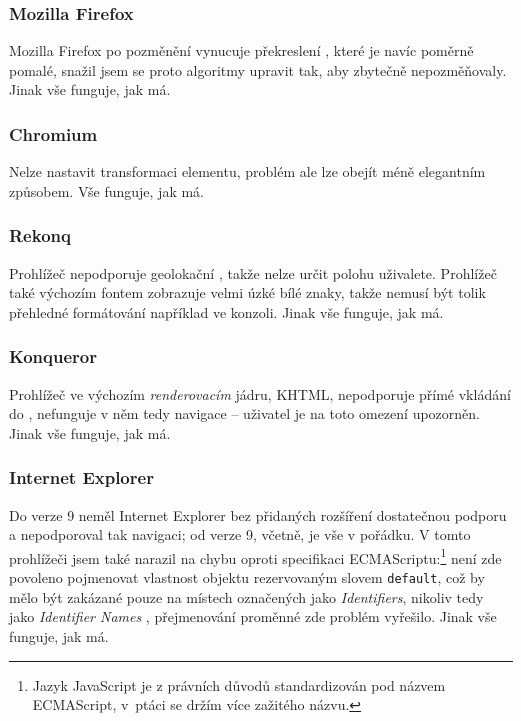 \subsubsection*{Mozilla Firefox}
Mozilla Firefox po pozměnění vynucuje překreslení , které je navíc poměrně pomalé, snažil jsem se proto algoritmy upravit tak, aby  zbytečně nepozměňovaly. Jinak vše funguje, jak má.

\subsubsection*{Chromium}
Nelze nastavit transformaci  elementu, problém ale lze obejít méně elegantním způsobem. Vše funguje, jak má.

\subsubsection*{Rekonq}
Prohlížeč nepodporuje geolokační , takže nelze určit polohu uživalete. Prohlížeč také výchozím fontem zobrazuje velmi úzké bílé znaky, takže nemusí být tolik přehledné formátování například ve  konzoli. Jinak vše funguje, jak má.

\subsubsection*{Konqueror}
Prohlížeč ve výchozím \textit{renderovacím} jádru, KHTML, nepodporuje přímé vkládání  do , nefunguje v něm tedy navigace -- uživatel je na toto omezení upozorněn. Jinak vše funguje, jak má.

\subsubsection*{Internet Explorer}
Do verze 9 neměl Internet Explorer bez přidaných rozšíření dostatečnou podporu  a nepodporoval tak navigaci; od verze 9, včetně, je vše v pořádku. V tomto prohlížeči jsem také narazil na chybu oproti specifikaci ECMAScriptu:\footnote{Jazyk JavaScript je z právních důvodů standardizován pod názvem ECMAScript, v~ptáci se držím více zažitého názvu.} není zde povoleno pojmenovat vlastnost objektu rezervovaným slovem \texttt{default}, což by mělo být zakázané pouze na místech označených jako \textit{Identifiers}, nikoliv tedy jako \textit{Identifier Names} \cite{JsIdentifiers}, přejmenování proměnné zde problém vyřešilo. Jinak vše funguje, jak má.

